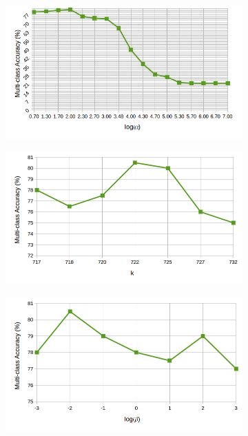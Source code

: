 \begin{figure}[!h]
\begin{subfigure}[b]{0.3\linewidth}
  \end{subfigure}
    \begin{subfigure}[b]{0.3\linewidth}
    \includegraphics[width=\linewidth]{images/simple_gamma_sun.png}
  \end{subfigure}
  \begin{subfigure}[b]{0.3\linewidth}
    \includegraphics[width=\linewidth]{images/simple_k_sun}
  \end{subfigure}
  \begin{subfigure}[b]{0.3\linewidth}
    \includegraphics[width=\linewidth]{images/simple_beta_sun}

\end{subfigure}
\end{figure}
